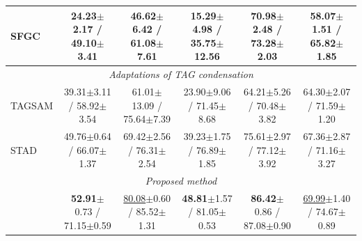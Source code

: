 \begin{table}[t]
{\begin{tabular}{lccccc}
SFGC & 24.23$\pm$2.17 / 49.10$\pm$3.41 & 46.62$\pm$6.42 / 61.08$\pm$7.61 & 15.29$\pm$4.98 / 35.75$\pm$12.56 & 70.98$\pm$2.48 / 73.28$\pm$2.03 & 58.07$\pm$1.51 / 65.82$\pm$1.85\\
\midrule
\multicolumn{6}{c}{\emph{Adaptations of TAG condensation}}\\
TAGSAM & 39.31$\pm$3.11 / 58.92$\pm$3.54 & 61.01$\pm$13.09 / 75.64$\pm$7.39 & 23.90$\pm$9.06 / 71.45$\pm$8.68 & 64.21$\pm$5.26 / 70.48$\pm$3.82 & 64.30$\pm$2.07 / 71.59$\pm$1.20\\
STAD & 49.76$\pm$0.64 / 66.07$\pm$1.37 & 69.42$\pm$2.56 / 76.31$\pm$2.54 & 39.23$\pm$1.75 / 76.89$\pm$1.85 & 75.61$\pm$2.97 / 77.12$\pm$3.92 & 67.36$\pm$2.87 / 71.16$\pm$3.27\\
\midrule
\multicolumn{6}{c}{\emph{Proposed method}}\\
\method{} & \textbf{52.91}$\pm$0.73 / 71.15$\pm$0.59 & \underline{80.08}$\pm$0.60 / 85.52$\pm$1.31 & \textbf{48.81}$\pm$1.57 / 81.05$\pm$0.53 & \textbf{86.42}$\pm$0.86 / 87.08$\pm$0.90 & \underline{69.99}$\pm$1.40 / 74.67$\pm$0.89\\
\bottomrule
\end{tabular}}
\end{table}
